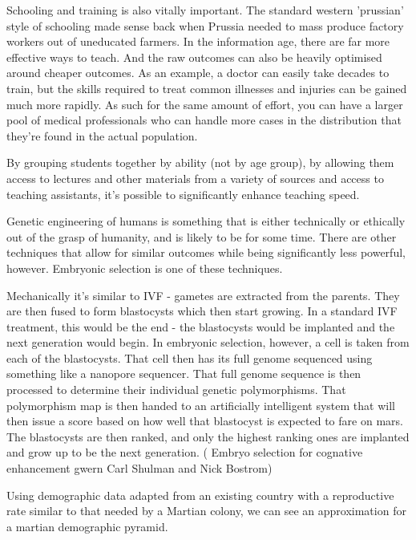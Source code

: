 \documentclass[10pt]{article}
\begin{document}
Schooling and training is also vitally important. The standard western 'prussian' style of schooling made sense back when Prussia needed to mass produce factory workers out of uneducated farmers. In the information age, there are far more effective ways to teach. And the raw outcomes can also be heavily optimised around cheaper outcomes. As an example, a doctor can easily take decades to train, but the skills required to treat common illnesses and injuries can be gained much more rapidly. As such for the same amount of effort, you can have a larger pool of medical professionals who can handle more cases in the distribution that they're found in the actual population.

By grouping students together by ability (not by age group), by allowing them access to lectures and other materials from a variety of sources and access to teaching assistants, it's possible to significantly enhance teaching speed.

Genetic engineering of humans is something that is either technically or ethically out of the grasp of humanity, and is likely to be for some time. There are other techniques that allow for similar outcomes while being significantly less powerful, however. Embryonic selection is one of these techniques.

Mechanically it's similar to IVF - gametes are extracted from the parents. They are then fused to form blastocysts which then start growing. In a standard IVF treatment, this would be the end - the blastocysts would be implanted and the next generation would begin. In embryonic selection, however, a cell is taken from each of the blastocysts. That cell then has its full genome sequenced using something like a nanopore sequencer. That full genome sequence is then processed to determine their individual genetic polymorphisms. That polymorphism map is then handed to an artificially intelligent system that will then issue a score based on how well that blastocyst is expected to fare on mars. The blastocysts are then ranked, and only the highest ranking ones are implanted and grow up to be the next generation. (
Embryo selection for cognative enhancement gwern Carl Shulman and Nick Bostrom)


Using demographic data adapted from an existing country with a reproductive rate similar to that needed by a Martian colony, we can see an approximation for a martian demographic pyramid.
\end{document}
